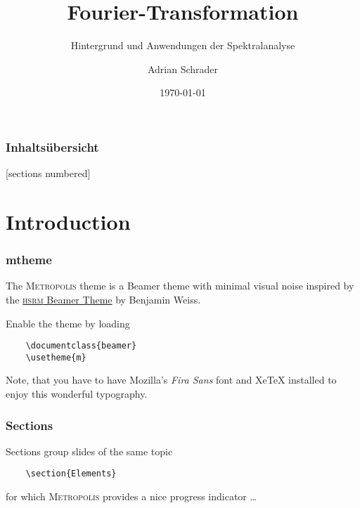 \documentclass[10pt]{beamer}
\title{Fourier-Transformation}
\subtitle{Hintergrund und Anwendungen der Spektralanalyse}
\date{\today}
\author{Adrian Schrader}
\institute{Physik 4h, Herr Kuhn}
\begin{document}
\maketitle

\begin{frame}
  \frametitle{Inhaltsübersicht}
  [sections numbered]
  \tableofcontents
\end{frame}

\section{Introduction}

\begin{frame}[fragile]
  \frametitle{mtheme}

  The \textsc{Metropolis} theme is a Beamer theme with minimal visual noise
  inspired by the \href{https://github.com/hsrmbeamertheme/hsrmbeamertheme}{\textsc{hsrm} Beamer
  Theme} by Benjamin Weiss.

  Enable the theme by loading

  \begin{verbatim}    \documentclass{beamer}
    \usetheme{m}\end{verbatim}

  Note, that you have to have Mozilla's \emph{Fira Sans} font and XeTeX
  installed to enjoy this wonderful typography.
\end{frame}
\begin{frame}[fragile]
  \frametitle{Sections}
  Sections group slides of the same topic

  \begin{verbatim}    \section{Elements}\end{verbatim}

  for which \textsc{Metropolis} provides a nice progress indicator \ldots
\end{frame}


\begin{frame}[allowframebreaks]

  \nocite{*}
  
  

\end{frame}
\end{document}
